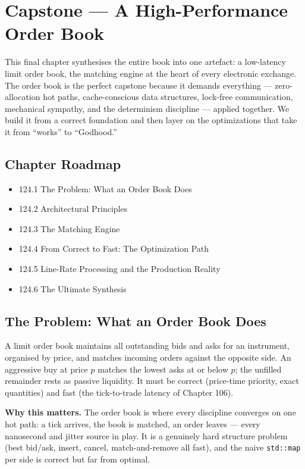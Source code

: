 \chapter{Capstone --- A High-Performance Order Book}

This final chapter synthesises the entire book into one artefact: a low-latency limit order book, the matching engine at the heart of every electronic exchange. The order book is the perfect capstone because it demands everything --- zero-allocation hot paths, cache-conscious data structures, lock-free communication, mechanical sympathy, and the determinism discipline --- applied together. We build it from a correct foundation and then layer on the optimizations that take it from ``works'' to ``Godhood.''

\section*{Chapter Roadmap}
\begin{itemize}
\item 124.1 The Problem: What an Order Book Does
\item 124.2 Architectural Principles
\item 124.3 The Matching Engine
\item 124.4 From Correct to Fast: The Optimization Path
\item 124.5 Line-Rate Processing and the Production Reality
\item 124.6 The Ultimate Synthesis
\end{itemize}

\section{The Problem: What an Order Book Does}
A limit order book maintains all outstanding bids and asks for an instrument, organised by price, and matches incoming orders against the opposite side. An aggressive buy at price $p$ matches the lowest asks at or below $p$; the unfilled remainder rests as passive liquidity. It must be correct (price-time priority, exact quantities) and fast (the tick-to-trade latency of Chapter 106).

\textbf{Why this matters.} The order book is where every discipline converges on one hot path: a tick arrives, the book is matched, an order leaves --- every nanosecond and jitter source in play. It is a genuinely hard structure problem (best bid/ask, insert, cancel, match-and-remove all fast), and the naive \texttt{std::map} per side is correct but far from optimal.

